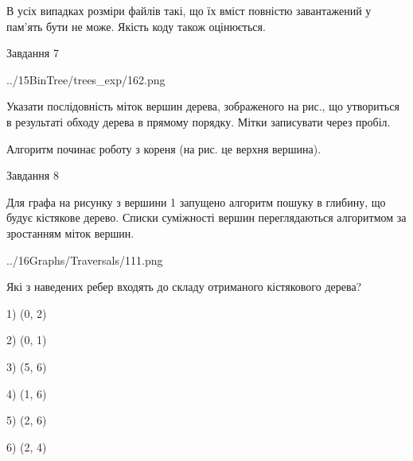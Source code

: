 \documentclass[12pt, ukrainian]{article}
\begin{document}
{В усіх випадках розміри файлів такі, що їх вміст повністю завантажений у пам'ять бути не може. Якість коду також оцінюється.



\vspace{10mm}\par

\newpage
\begin{minipage}[t]{9.7cm}
               
{\begin{center}Завдання {7}\end{center}}
\vspace{-4mm}

\begin{center}
	{../15BinTree/trees_exp/162.png}
\end{center}
Указати послідовність міток вершин дерева, зображеного на рис., що утвориться в результаті обходу дерева в прямому порядку. Мітки записувати через пробіл.\par Алгоритм починає роботу з кореня (на рис. це верхня вершина).\par

\end{minipage}
\vline \hspace{8mm}
\begin{minipage}[t]{8.0cm}
               
{\begin{center}Завдання {8}\end{center}}
\vspace{-4mm}
Для графа на рисунку з вершини 1 запущено алгоритм пошуку в глибину, що будує кістякове дерево. Списки суміжності вершин переглядаються алгоритмом за зростанням міток вершин.\par
\begin{center}
	{../16Graphs/Traversals/111.png}
\end{center}
\par Які з наведених ребер входять до складу отриманого кістякового дерева?\par
1) (0, 2)\par
2) (0, 1)\par
3) (5, 6)\par
4) (1, 6)\par
5) (2, 6)\par
6) (2, 4)\par
{\vskip 15pt} \par


\end{minipage}}
\end{document}
